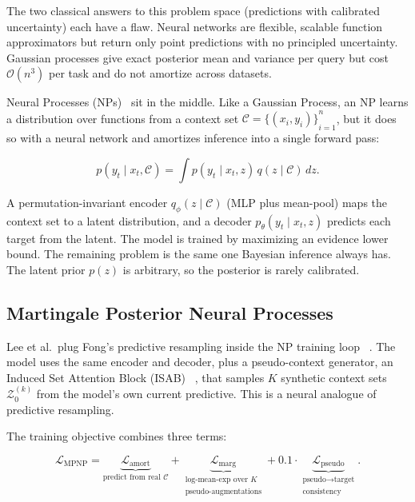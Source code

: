 \documentclass[11pt]{article}
\begin{document}
The two classical answers to this problem space (predictions with calibrated uncertainty)
each have a flaw. Neural networks are flexible, scalable function
approximators but return only point predictions with no principled
uncertainty. Gaussian processes give exact posterior mean and variance
per query but cost $\mathcal{O}(n^3)$ per task and do not amortize across
datasets.

Neural Processes (NPs)~\cite{garnelo2018} sit in the middle. Like a
Gaussian Process, an NP learns a distribution over functions from a
context set $\mathcal{C} = {\{(x_i, y_i)\}}_{i=1}^{n}$, but it does so
with a neural network and amortizes inference into a single forward
pass:

\begin{equation}
	p(y_t \mid x_t, \mathcal{C}) = \int p(y_t \mid x_t, z)\,
	q(z \mid \mathcal{C})\, dz.
\end{equation}

A permutation-invariant encoder $q_\phi(z \mid \mathcal{C})$ (MLP plus
mean-pool) maps the context set to a latent distribution, and a decoder
$p_\theta(y_t \mid x_t, z)$ predicts each target from the latent. The
model is trained by maximizing an evidence lower bound. The remaining
problem is the same one Bayesian inference always has. The latent prior
$p(z)$ is arbitrary, so the posterior is rarely calibrated.

\subsection{Martingale Posterior Neural Processes}

Lee et al.\ plug Fong's predictive resampling inside the NP training loop
~\cite{lee2023}. The model uses the same encoder and decoder, plus a
pseudo-context generator, an Induced Set Attention Block (ISAB)
~\cite{lee2019set}, that samples $K$ synthetic context sets
$\mathcal{Z}_0^{(k)}$ from the model's own current predictive. This is a
neural analogue of predictive resampling.

The training objective combines three terms:

\begin{equation}
	\boxed{\mathcal{L}_{\text{MPNP}} =
	\underbrace{\mathcal{L}_{\text{amort}}}_{\text{predict from real }\mathcal{C}}
	+
	\underbrace{\mathcal{L}_{\text{marg}}}_{\substack{\text{log-mean-exp over }K\\\text{pseudo-augmentations}}}
	+
	0.1 \cdot
	\underbrace{\mathcal{L}_{\text{pseudo}}}_{\substack{\text{pseudo}\to\text{target}\\\text{consistency}}}.}
\end{equation}
\end{document}
